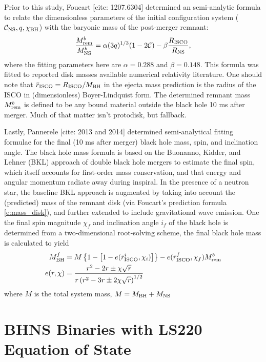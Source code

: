 Prior to this study, Foucart [cite: 1207.6304] determined an semi-analytic formula to relate the dimensionless parameters of the initial configuration system ($\mathcal{C}_{\rm NS}, q, \chi_{\rm BH} $) with the baryonic mass of the post-merger remnant:
\begin{align}
\label{e:mass_disk}
\frac{M^b_{\rm rem}}{M^b_{\rm NS}} = 
\alpha (3 q)^{1/3} (1 - 2 \mathcal{C} )
-\beta  \frac{R_{\rm ISCO}}{R_{\rm NS}},
\end{align}
where the fitting parameters here are $\alpha = 0.288$ and $\beta = 0.148$.
This formula was fitted to reported disk masses available numerical relativity literature.
One should note that $\bar{r}_{\rm ISCO} = R_{\rm ISCO}/M_{\rm BH}$ in the ejecta mass prediction is the radius of the ISCO in (dimensionless)  Boyer-Lindquist form.
The determined remnant mass $M^b_{\rm rem}$ is defined to be any bound material outside the black hole 10 ms after merger.  
Much of that matter isn't protodisk, but fallback.

Lastly, Pannerele [cite: 2013 and 2014] determined semi-analytical fitting formulae for the final (10 ms after merger) black hole mass, spin, and inclination angle.  The black hole mass formula is based on the Buonanno, Kidder, and Lehner (BKL) approach of double black hole mergers to estimate the final spin, which itself accounts for first-order mass conservation, and that energy and angular momentum radiate away during inspiral.  
In the presence of a neutron star, the baseline BKL approach is augmented by taking into account the (predicted) mass of the remnant disk (via Foucart's prediction formula \ref{e:mass_disk}), and further extended to include gravitational wave emission.  One the final spin magnitude  $\chi_f$ and inclination angle $i_f$ of the black hole is determined from a two-dimensional root-solving scheme, the final black hole mass is calculated to yield
\begin{align}
M^f_{\rm BH} &= 
M \left \{ 
1 - \left[1-e(\bar{r}^i_{\rm ISCO}, \chi_i) \right]
\right \}
- e(\bar{r}^f_{\rm ISCO}, \chi_f) M^b_{\rm rem}\\
e(r, \chi) &= 
\frac{ r^2 - 2 r \pm \chi \sqrt{r} }
{ r \left(r^2 - 3r \pm 2 \chi \sqrt{r}\right)^{1/2} }
\end{align}
where $M$ is the total system mass, $M = M_{\rm BH} +M_{\rm NS}$

\section{BHNS Binaries with LS220 Equation of State}

